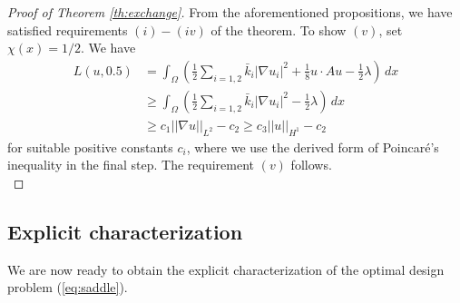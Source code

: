 \documentclass[11pt]{article}
\begin{document}
\begin{proof}[Proof of Theorem \ref{th:exchange}]
From the aforementioned propositions, we have satisfied requirements $(i)-(iv)$ of the theorem.  To show $(v)$, set  $\chi(x)=1/2$.  We have
\begin{align*}
L(u,0.5)&= \int_\Omega 
\left( \frac{1}{2} \sum_{i=1,2} \bar{k}_i |\nabla u_i|^2 + \frac{1}{8}u \cdot A u -\frac{1}{2}\lambda \right) \,dx\\
&\geq \int_\Omega \left( \frac{1}{2} \sum_{i=1,2} \bar{k}_i |\nabla u_i|^2  -\frac{1}{2}\lambda \right) \, dx\\
&\geq  c_1 || \nabla u||_{L^2} -c_2
 \geq c_3 || u||_{H^1} -c_2
\end{align*}
for suitable positive constants $c_i$, where we use the derived form of Poincar{\'e}'s inequality in the final step.
The requirement $(v)$ follows.\\
\end{proof}


 \subsection{Explicit characterization}
 
 We are now ready to obtain the explicit characterization of the optimal design problem (\ref{eq:saddle}).
 
\end{document}
